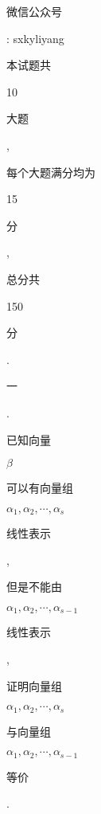 \documentclass[10pt]{article}
\begin{document}
\begin{CJK}{UTF8}{mj}微信公众号\end{CJK}: sxkyliyang

\begin{CJK}{UTF8}{mj}本试题共\end{CJK} 10 \begin{CJK}{UTF8}{mj}大题\end{CJK}, \begin{CJK}{UTF8}{mj}每个大题满分均为\end{CJK} 15 \begin{CJK}{UTF8}{mj}分\end{CJK}, \begin{CJK}{UTF8}{mj}总分共\end{CJK} 150 \begin{CJK}{UTF8}{mj}分\end{CJK}.

\begin{CJK}{UTF8}{mj}一\end{CJK}. \begin{CJK}{UTF8}{mj}已知向量\end{CJK} $\beta$ \begin{CJK}{UTF8}{mj}可以有向量组\end{CJK} $\alpha_{1}, \alpha_{2}, \cdots, \alpha_{s}$ \begin{CJK}{UTF8}{mj}线性表示\end{CJK}, \begin{CJK}{UTF8}{mj}但是不能由\end{CJK} $\alpha_{1}, \alpha_{2}, \cdots, \alpha_{s-1}$ \begin{CJK}{UTF8}{mj}线性表示\end{CJK}, \begin{CJK}{UTF8}{mj}证明向量组\end{CJK} $\alpha_{1}, \alpha_{2}, \cdots, \alpha_{s}$ \begin{CJK}{UTF8}{mj}与向量组\end{CJK} $\alpha_{1}, \alpha_{2}, \cdots, \alpha_{s-1}$ \begin{CJK}{UTF8}{mj}等价\end{CJK}.
\end{document}
